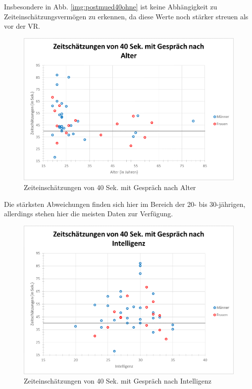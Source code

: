 \documentclass{Paper}
\begin{document}
Insbesondere in Abb. \ref{img:postmued40ohne} ist keine Abhängigkeit zu Zeiteinschätzungsvermögen zu erkennen, da diese Werte noch stärker streuen als vor der VR.


\begin{figure}[H]
	\centering
	\includegraphics[scale=0.7]{../Diagramme/scatterPost/40mit_alter.png}
	\caption{Zeiteinschätzungen von 40 Sek. mit Gespräch nach Alter}
	\label{img:postalter40mit}
\end{figure}

Die stärksten Abweichungen finden sich hier im Bereich der 20- bis 30-jährigen, allerdings stehen hier die meisten Daten zur Verfügung. 


\begin{figure}[H]
	\centering
	\includegraphics[scale=0.7]{../Diagramme/scatterPost/40mit_intelligenz.png}
	\caption{Zeiteinschätzungen von 40 Sek. mit Gespräch nach Intelligenz}
	\label{img:postintell40mit}
\end{figure}
\end{document}
